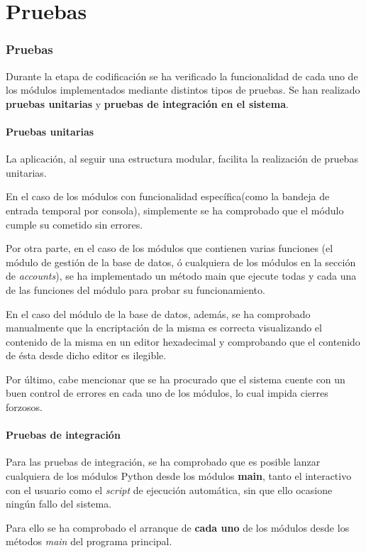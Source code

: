 \chapter{Pruebas}
\label{chap:pruebas}

\subsection{Pruebas}
Durante la etapa de codificación se ha verificado la funcionalidad de cada uno de los módulos implementados mediante distintos tipos de pruebas. 
Se han realizado \textbf{pruebas unitarias} y \textbf{pruebas de integración en el sistema}.

\subsubsection{Pruebas unitarias}

La aplicación, al seguir una estructura modular, facilita la realización de pruebas unitarias.

En el caso de los módulos con funcionalidad específica(como la bandeja de entrada temporal por consola), simplemente se ha comprobado que el módulo cumple su cometido sin errores.

Por otra parte, en el caso de los módulos que contienen varias funciones (el módulo de gestión de la base de datos, ó cualquiera de los módulos en la sección de \textit{accounts}), se ha implementado un método main que ejecute todas y cada una de las funciones del módulo para probar su funcionamiento.

En el caso del módulo de la base de datos, además, se ha comprobado manualmente que la encriptación de la misma es correcta visualizando el contenido de la misma en un editor hexadecimal y comprobando que el contenido de ésta desde dicho editor es ilegible.

Por último, cabe mencionar que se ha procurado que el sistema cuente con un buen control de errores en cada uno de los módulos, lo cual impida cierres forzosos.

\subsubsection{Pruebas de integración}

Para las pruebas de integración, se ha comprobado que es posible lanzar cualquiera de los módulos Python desde los módulos \textbf{main}, tanto el interactivo con el usuario como el \textit{script} de ejecución automática, sin que ello ocasione ningún fallo del sistema.

Para ello se ha comprobado el arranque de \textbf{cada uno} de los módulos desde los métodos \textit{main} del programa principal.




\label{sect:sistemasreferencia}

\label{sect:escenarios_pruebas}
 
